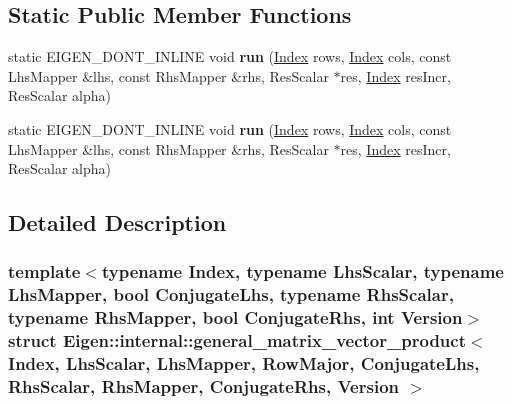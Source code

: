 \subsection*{Static Public Member Functions}
\begin{DoxyCompactItemize}
\item 
\mbox{\label{struct_eigen_1_1internal_1_1general__matrix__vector__product_3_01_index_00_01_lhs_scalar_00_01_l24320a1e63993864008333cadda60258_afb8a4749f583d4725c5254d91c9fcbfb}} 
static E\+I\+G\+E\+N\+\_\+\+D\+O\+N\+T\+\_\+\+I\+N\+L\+I\+NE void {\bfseries run} (\hyperlink{namespace_eigen_a62e77e0933482dafde8fe197d9a2cfde}{Index} rows, \hyperlink{namespace_eigen_a62e77e0933482dafde8fe197d9a2cfde}{Index} cols, const Lhs\+Mapper \&lhs, const Rhs\+Mapper \&rhs, Res\+Scalar $\ast$res, \hyperlink{namespace_eigen_a62e77e0933482dafde8fe197d9a2cfde}{Index} res\+Incr, Res\+Scalar alpha)
\item 
\mbox{\label{struct_eigen_1_1internal_1_1general__matrix__vector__product_3_01_index_00_01_lhs_scalar_00_01_l24320a1e63993864008333cadda60258_aaad333e9a13e83d08f99403361faf240}} 
static E\+I\+G\+E\+N\+\_\+\+D\+O\+N\+T\+\_\+\+I\+N\+L\+I\+NE void {\bfseries run} (\hyperlink{namespace_eigen_a62e77e0933482dafde8fe197d9a2cfde}{Index} rows, \hyperlink{namespace_eigen_a62e77e0933482dafde8fe197d9a2cfde}{Index} cols, const Lhs\+Mapper \&lhs, const Rhs\+Mapper \&rhs, Res\+Scalar $\ast$res, \hyperlink{namespace_eigen_a62e77e0933482dafde8fe197d9a2cfde}{Index} res\+Incr, Res\+Scalar alpha)
\end{DoxyCompactItemize}


\subsection{Detailed Description}
\subsubsection*{template$<$typename Index, typename Lhs\+Scalar, typename Lhs\+Mapper, bool Conjugate\+Lhs, typename Rhs\+Scalar, typename Rhs\+Mapper, bool Conjugate\+Rhs, int Version$>$\newline
struct Eigen\+::internal\+::general\+\_\+matrix\+\_\+vector\+\_\+product$<$ Index, Lhs\+Scalar, Lhs\+Mapper, Row\+Major, Conjugate\+Lhs, Rhs\+Scalar, Rhs\+Mapper, Conjugate\+Rhs, Version $>$}



